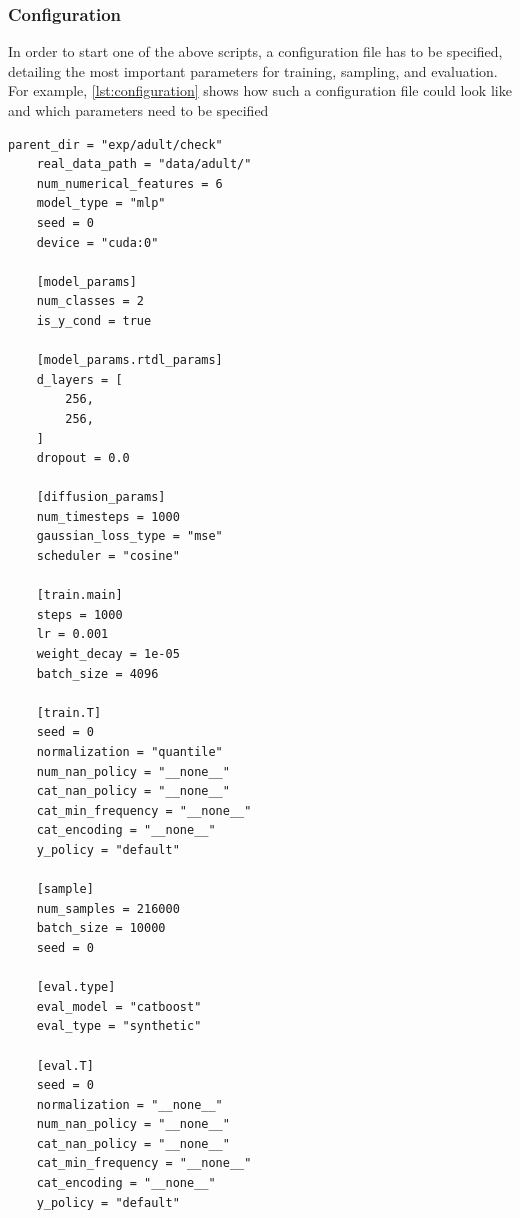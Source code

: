 \subsubsection[]{Configuration}

In order to start one of the above scripts, a configuration file has to be specified, detailing the most important parameters for training, sampling, and evaluation.
For example, \autoref{lst:configuration} shows how such a configuration file could look like and which parameters need to be specified

\begin{lstlisting}[label={lst:configuration}, caption={Example Configuration File}]
    parent_dir = "exp/adult/check"
    real_data_path = "data/adult/"
    num_numerical_features = 6
    model_type = "mlp"
    seed = 0
    device = "cuda:0"

    [model_params]
    num_classes = 2
    is_y_cond = true

    [model_params.rtdl_params]
    d_layers = [
        256,
        256,
    ]
    dropout = 0.0

    [diffusion_params]
    num_timesteps = 1000
    gaussian_loss_type = "mse"
    scheduler = "cosine"

    [train.main]
    steps = 1000
    lr = 0.001
    weight_decay = 1e-05
    batch_size = 4096

    [train.T]
    seed = 0
    normalization = "quantile"
    num_nan_policy = "__none__"
    cat_nan_policy = "__none__"
    cat_min_frequency = "__none__"
    cat_encoding = "__none__"
    y_policy = "default"

    [sample]
    num_samples = 216000
    batch_size = 10000
    seed = 0

    [eval.type]
    eval_model = "catboost"
    eval_type = "synthetic"

    [eval.T]
    seed = 0
    normalization = "__none__"
    num_nan_policy = "__none__"
    cat_nan_policy = "__none__"
    cat_min_frequency = "__none__"
    cat_encoding = "__none__"
    y_policy = "default"
\end{lstlisting}


